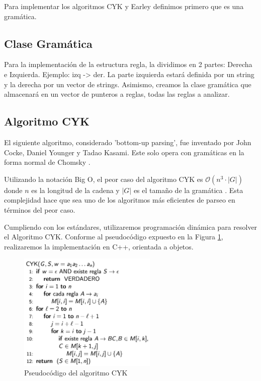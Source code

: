 \documentclass[12pt]{article}
\begin{document}
Para implementar los algoritmos CYK y Earley definimos primero que es una gramática.

\subsection{Clase Gramática}
Para la implementación de la estructura regla, la dividimos en 2 partes: Derecha e Izquierda. Ejemplo: izq -> der. La parte izquierda estará definida por un string y la derecha por un vector de strings. Asimismo, creamos la clase gramática que almacenará en un vector de punteros a reglas, todas las reglas a analizar.


%

\newpage


\subsection{Algoritmo CYK}
El siguiente algoritmo, considerado 'bottom-up parsing', fue inventado por John Cocke, Daniel Younger y Tadao Kasami. Este solo opera con gramáticas en la forma normal de Chomsky \cite{CYKAlgorithmWiki}. 

Utilizando la notación Big O, el peor caso del algoritmo CYK es  
 ${\displaystyle {\mathcal {O}}\left(n^{3}\cdot \left|G\right|\right)}$ donde ${\displaystyle n}$ es la longitud de la cadena y ${\displaystyle \left|G\right|}$ es el tamaño de la gramática \cite{HopcroftUllman}. Esta complejidad hace que sea uno de los algoritmos más eficientes de parseo en términos del peor caso.

Cumpliendo con los estándares, utilizaremos programación dinámica para resolver el Algoritmo CYK. Conforme al pseudocódigo expuesto en la Figura \ref{fig:pCYK}, realizaremos la implementación en C++, orientada a objetos.

\begin{figure}[h!]
    \centering
    \includegraphics[width=250px]{img/pCYK.png}
    \caption{Pseudocódigo del algoritmo CYK}
    \label{fig:pCYK}
\end{figure} 
\end{document}

